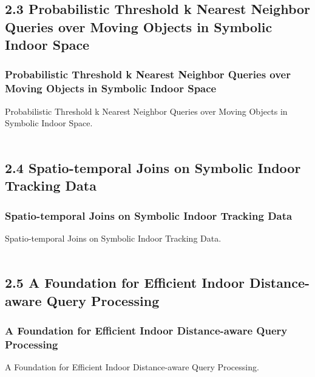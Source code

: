 \documentclass{beamer}
\begin{document}

\subsection{2.3 Probabilistic Threshold k Nearest Neighbor Queries over Moving Objects in Symbolic Indoor Space} %

\begin{frame}
\frametitle{Probabilistic Threshold k Nearest Neighbor Queries over Moving Objects in Symbolic Indoor Space}
Probabilistic Threshold k Nearest Neighbor Queries over Moving Objects in Symbolic Indoor Space.~\cite{DBLP:conf/edbt/YangLJ10}\\~\\


\end{frame}


\subsection{2.4 Spatio-temporal Joins on Symbolic Indoor Tracking Data} %

\begin{frame}
\frametitle{Spatio-temporal Joins on Symbolic Indoor Tracking Data}
Spatio-temporal Joins on Symbolic Indoor Tracking Data.~\cite{DBLP:conf/icde/LuYCJ11}\\~\\


\end{frame}


\subsection{2.5 A Foundation for Efficient Indoor Distance-aware Query Processing} %

\begin{frame}
\frametitle{A Foundation for Efficient Indoor Distance-aware Query Processing}
A Foundation for Efficient Indoor Distance-aware Query Processing.~\cite{DBLP:conf/icde/LuCJ12}\\~\\


\end{frame}
\end{document}
